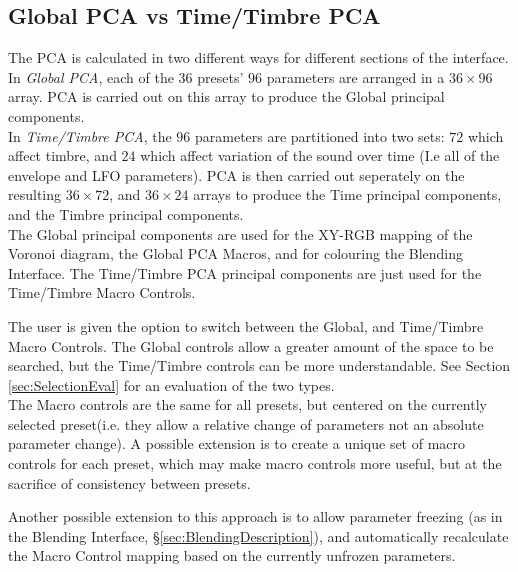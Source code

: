\documentclass[11pt, oneside]{report}   	%
\begin{document}
\subsection{Global PCA vs Time/Timbre PCA}\label{sec:GlobalTimeTimbre}
The PCA is calculated in two different ways for different sections of the interface. In \emph{Global PCA}, each of the $36$ presets' $96$ parameters are arranged in a $36 \times 96$ array. PCA is carried out on this array to produce the Global principal components. 
\\
In \emph{Time/Timbre PCA}, the $96$ parameters are partitioned into two sets: $72$ which affect timbre, and $24$ which affect variation of the sound over time (I.e all of the envelope and LFO parameters). PCA is then carried out seperately on the resulting  $36 \times 72$, and $36 \times 24$ arrays to produce the Time principal components, and the Timbre principal components. 
\\
The Global principal components are used for the XY-RGB mapping of the Voronoi diagram, the Global PCA Macros, and for colouring the Blending Interface. The Time/Timbre PCA principal components are just used for the Time/Timbre Macro Controls.

The user is given the option to switch between the Global, and Time/Timbre Macro Controls. The Global controls allow a greater amount of the space to be searched, but the Time/Timbre controls can be more understandable. See Section \ref{sec:SelectionEval} for an evaluation of the two  types.\\
The Macro controls are the same for all presets, but centered on the currently selected preset(i.e. they allow a relative change of parameters not an absolute parameter change). A possible extension is to create a unique set of macro controls for each preset, which may make macro controls more useful, but at the sacrifice of consistency between presets.

Another possible extension to this approach is to allow parameter freezing (as in the Blending Interface, \S \ref{sec:BlendingDescription}), and automatically recalculate the Macro Control mapping based on the currently unfrozen parameters.
\end{document}
